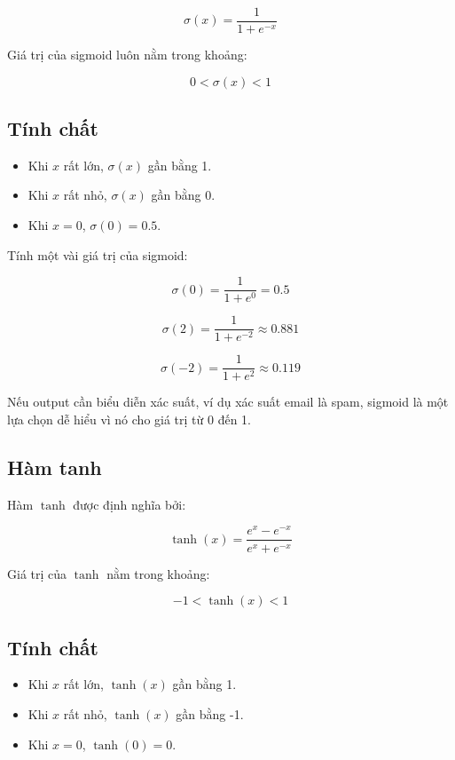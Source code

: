 \[
    \sigma(x) = \frac{1}{1+e^{-x}}
\]

Giá trị của sigmoid luôn nằm trong khoảng:

\[
    0 < \sigma(x) < 1
\]

\subsection{Tính chất}

\begin{itemize}
    \item Khi $x$ rất lớn, $\sigma(x)$ gần bằng 1.
    \item Khi $x$ rất nhỏ, $\sigma(x)$ gần bằng 0.
    \item Khi $x=0$, $\sigma(0)=0.5$.
\end{itemize}

\begin{vidu}
Tính một vài giá trị của sigmoid:

\[
    \sigma(0)=\frac{1}{1+e^0}=0.5
\]

\[
    \sigma(2)=\frac{1}{1+e^{-2}}\approx 0.881
\]

\[
    \sigma(-2)=\frac{1}{1+e^2}\approx 0.119
\]

Nếu output cần biểu diễn xác suất, ví dụ xác suất email là spam, sigmoid là một lựa chọn dễ hiểu vì nó cho giá trị từ 0 đến 1.
\end{vidu}

\subsection{Hàm tanh}

Hàm $\tanh$ được định nghĩa bởi:

\[
    \tanh(x) = \frac{e^x-e^{-x}}{e^x+e^{-x}}
\]

Giá trị của $\tanh$ nằm trong khoảng:

\[
    -1 < \tanh(x) < 1
\]

\subsection{Tính chất}

\begin{itemize}
    \item Khi $x$ rất lớn, $\tanh(x)$ gần bằng 1.
    \item Khi $x$ rất nhỏ, $\tanh(x)$ gần bằng -1.
    \item Khi $x=0$, $\tanh(0)=0$.
\end{itemize}

